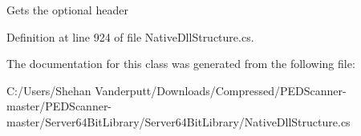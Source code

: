 Gets the optional header 



Definition at line 924 of file Native\+Dll\+Structure.\+cs.



The documentation for this class was generated from the following file\+:\begin{DoxyCompactItemize}
\item 
C\+:/\+Users/\+Shehan Vanderputt/\+Downloads/\+Compressed/\+P\+E\+D\+Scanner-\/master/\+P\+E\+D\+Scanner-\/master/\+Server64\+Bit\+Library/\+Server64\+Bit\+Library/Native\+Dll\+Structure.\+cs\end{DoxyCompactItemize}
